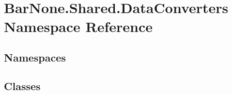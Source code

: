 \hypertarget{namespace_bar_none_1_1_shared_1_1_data_converters}{}\section{Bar\+None.\+Shared.\+Data\+Converters Namespace Reference}
\label{namespace_bar_none_1_1_shared_1_1_data_converters}
\subsection*{Namespaces}
\begin{DoxyCompactItemize}
\end{DoxyCompactItemize}
\subsection*{Classes}
